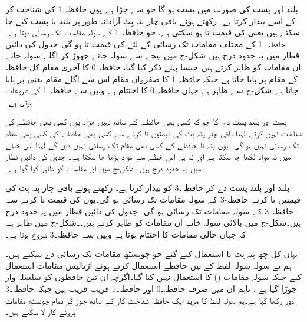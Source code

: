 بلند  اور پست  کی صورت میں  پست ہو گا جو  سے جڑا ہے۔یوں  حافظہ۔1 کی شناخت کر کے اسے بیدار کرتا ہے۔  رکھتے ہوئے باقی چار پتہ بِٹ آزادانہ طور پر بلند یا پست کیے جا سکتے ہیں یعنی  کی قیمت  تا  ہو سکتی ہے، جو حافظہ۔1 کے سولہ مقامات تک رسائی دیتا ہے۔حافظہ -1 کے مختلف مقامات تک رسائی کے لئے  کی قیمت  تا  ہو گی۔جدول کی دائیں قطار میں یہ حدود درج ہیں۔شکل-ج میں نیچے سے سولہ خانے چھوڑ کر اگلے سولہ خانے ان مقامات کو ظاہر کرتے ہیں۔جیسا پہلے ذکر کیا گیا، حافظہ۔0 کا آخری مقام کل حافظہ کے مقام  پر پایا جاتا ہے جبکہ حافظہ۔1 کا صفرواں مقام اس سے اگلے مقام یعنی  پر پایا جاتا ہے۔شکل-ج سے ظاہر ہے جہاں حافظہ۔0 کا اختتام ہے وہیں سے حافظہ۔1 کی شروعات ہوتی ہے۔

پست  اور بلند  پست  دے گا جو کہ کسی بھی حافظے کے ساتھ نہیں جڑا۔ یوں  کسی بھی حافظے کی شناخت نہیں کرتے لہٰذا باقی چار پتہ بِٹ کی قیمتیں  تا  کرنے سے کسی بھی حافظے کی کسی بھی مقام تک رسائی نہیں ہو گی۔ یوں پتہ  تا  حافظے کے کسی بھی مقام تک رسائی نہیں دیں گے لہٰذا اس خطے میں نہ مواد لکھا جا سکتا ہے اور نہ ہی اس خطے سے مواد پڑھا جا سکتا ہے۔ جدول کی دائیں قطار میں یہ حدود درج ہیں۔ شکل-ج میں ان مقامات کو ظاہر کیا گیا ہے۔

بلند  اور بلند  پست  دے کر حافظہ۔3 کو بیدار کرتا ہے۔  رکھتے ہوئے باقی چار پتہ بِٹ کی قیمتیں  تا  کرنے حافظہ-3 کے سولہ مقامات تک رسائی ہو گی۔یوں  کی قیمت  تا  کرنے سے حافظہ۔3 کے سولہ مقامات تک رسائی ہو گی۔ جدول کی دائیں قطار میں یہ حدود درج ہیں۔شکل-ج میں بالائی سولہ خانے ان مقامات کو ظاہر کرتے ہیں۔۔شکل-ج میں ظاہر ہے کہ جہاں خالی مقامات کا اختتام ہوتا ہے وہیں سے حافظہ۔3 شروع ہوتا ہے۔

یہاں کل چھ پتہ بِٹ  تا  استعمال کیے گئے جو چونسٹھ  مقامات تک رسائی دے سکتے ہیں۔ہم نے سولہ سولہ لفظ کے تین حافظے استعمال کرتے ہوئے اڑتالیس  مقامات استعمال کیے جبکہ سولہ  مقامات () کا استعمال نہیں کیا گیا۔اگرچہ ان تین حافظوں کو سلسلہ وار جوڑا گیا ہے ، تاہم ان میں صرف حافظہ۔0 اور حافظہ۔1 قریب قریب ہیں جبکہ حافظہ۔3 دور رکھا گیا ہے۔ہم سولہ لفظ کا مزید ایک حافظہ شناخت کار کے ساتھ جوڑ کر تمام چونسٹھ مقامات بروئے کار لا سکتے ہیں۔



